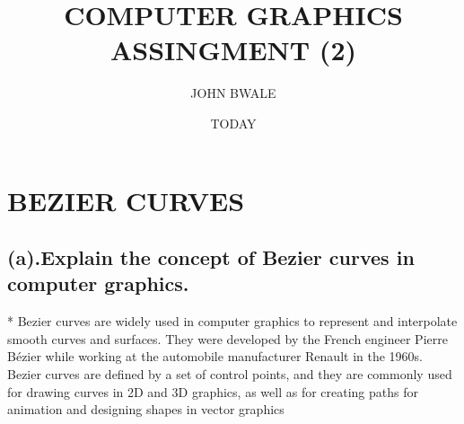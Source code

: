 \documentclass{article}
\begin{document}
\author{JOHN BWALE}
\title{COMPUTER GRAPHICS ASSINGMENT (2)}
\date{TODAY}
\maketitle


\section{BEZIER CURVES }
\subsection{(a).Explain the concept of Bezier curves in computer graphics.}
*  Bezier curves are widely used in computer graphics to represent and interpolate smooth curves and surfaces. They were developed by the French engineer Pierre Bézier while working at the automobile manufacturer Renault in the 1960s. Bezier curves are defined by a set of control points, and they are commonly used for drawing curves in 2D and 3D graphics, as well as for creating paths for animation and designing shapes in vector graphics
\end{document}
